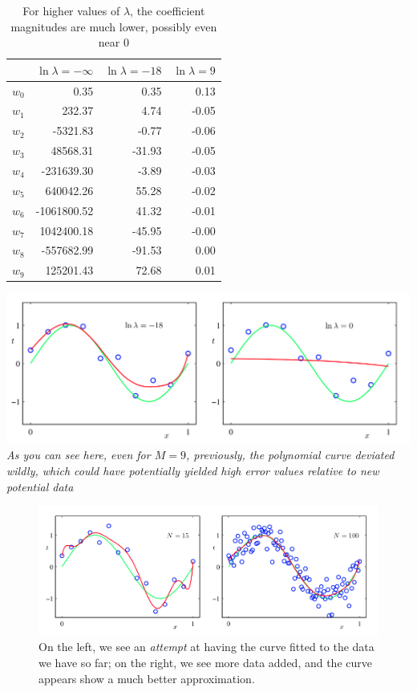 \documentclass{tufte-handout}
\begin{document}
\begin{table}[h]
  \footnotesize%
  \begin{center}
    \begin{tabular}{lrrr}
      \toprule
       & $\ln\lambda = -\infty$ & $\ln\lambda = -18$ & $\ln\lambda = 9$ \\
      \midrule
      $w_0$ &        0.35 &   0.35 &  0.13 \\
      $w_1$ &      232.37 &   4.74 & -0.05 \\
      $w_2$ &    -5321.83 &  -0.77 & -0.06 \\
      $w_3$ &    48568.31 & -31.93 & -0.05 \\
      $w_4$ &  -231639.30 &  -3.89 & -0.03 \\
      $w_5$ &   640042.26 &  55.28 & -0.02 \\
      $w_6$ & -1061800.52 &  41.32 & -0.01 \\
      $w_7$ &  1042400.18 & -45.95 & -0.00 \\
      $w_8$ &  -557682.99 & -91.53 &  0.00 \\
      $w_9$ &   125201.43 &  72.68 &  0.01 \\
      \bottomrule
    \end{tabular}
  \end{center}
  \caption{For higher values of $\lambda$, the coefficient magnitudes are much
    lower, possibly even near $0$}
  \label{tab:font-sizes}
\end{table}

\begin{fullwidth}
  \includegraphics[width=\linewidth]{lambda.png}
  \small{\itshape{As you can see here, even for $M = 9$, previously, the
  polynomial curve deviated wildly, which could have potentially yielded high
  error values relative to new potential data}}
\end{fullwidth}

\begin{figure}[h]
  \includegraphics[width=\linewidth]{moredata.png}%
  \caption{On the left, we see an \emph{attempt} at having the curve fitted to
  the data we have so far; on the right, we see more data added, and the curve
  appears show a much better approximation.}
\end{figure}
\end{document}
